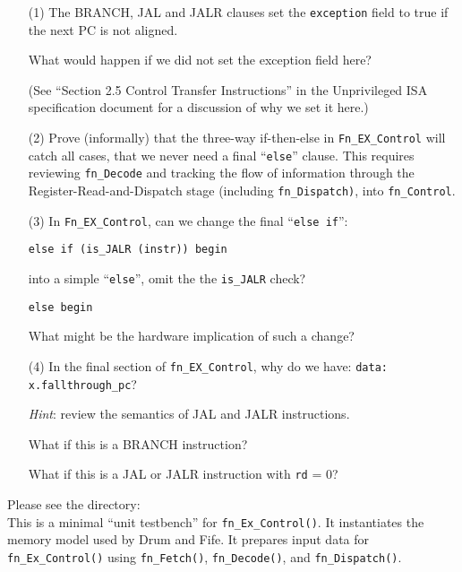\begin{itemize}

\item[(1)] The BRANCH, JAL and JALR clauses set the {\tt exception}
    field to true if the next PC is not aligned.

    What would happen if we did not set the exception field here?

    (See ``Section 2.5 Control Transfer Instructions'' in the
     Unprivileged ISA specification document
     \cite{RISCV_Unpriv_2019_12_13} for a discussion of why we set it
     here.)

\item[(2)] Prove (informally) that the three-way if-then-else in
    \verb|Fn_EX_Control| will catch all cases, {\ie} that we never
    need a final ``\verb|else|'' clause.  This requires reviewing
    \verb|fn_Decode| and tracking the flow of information through the
    Register-Read-and-Dispatch stage (including \verb|fn_Dispatch)|,
    into \verb|fn_Control|.

\item[(3)] In \verb|Fn_EX_Control|, can we change the final ``\verb|else if|'':

    {\footnotesize
    \begin{Verbatim}[frame=single]
   else if (is_JALR (instr)) begin
    \end{Verbatim}
    }

    into a simple ``\verb|else|'', {\ie} omit the the \verb|is_JALR|
    check?

    {\footnotesize
    \begin{Verbatim}[frame=single]
   else begin
    \end{Verbatim}
    }

    What might be the hardware implication of such a change?

\item[(4)] In the final section of {\tt fn\_EX\_Control}, why do we
    have: \verb|data: x.fallthrough_pc|?

    \emph{Hint}: review the semantics of JAL and JALR instructions.

    What if this is a BRANCH instruction?

    What if this is a JAL or JALR instruction with \verb|rd| = 0?
\end{itemize}

Please see the directory:  \\
This is a minimal ``unit testbench'' for \verb|fn_Ex_Control()|.  It
instantiates the memory model used by Drum and Fife.  It prepares
input data for \verb|fn_Ex_Control()| using \verb|fn_Fetch()|,
\verb|fn_Decode()|, and \verb|fn_Dispatch()|.

